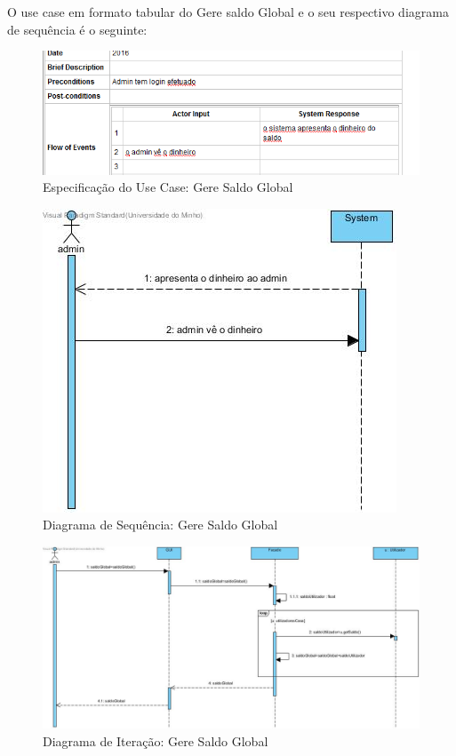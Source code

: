 O use case em formato tabular do Gere saldo Global e o seu respectivo diagrama de sequência é o seguinte:

\begin{figure}[htb!]
	\centering
	\includegraphics[scale=0.6]{imagens/Especificacoes/geresaldoglobal}  
	\caption{Especificação do Use Case: Gere Saldo Global  }  
\end{figure}

\begin{figure}[htb!]
	\centering
	\includegraphics[scale=0.5]{imagens/diagramaSeq/GereSaldoGlobal}  
	\caption{Diagrama de Sequência: Gere Saldo Global}  
\end{figure}


\begin{figure}[htb!]
	\centering
	\includegraphics[scale=0.4]{imagens/diagramaIt/GereSaldoGlobalIteracao}  
	\caption{Diagrama de Iteração: Gere Saldo Global}  
\end{figure}

